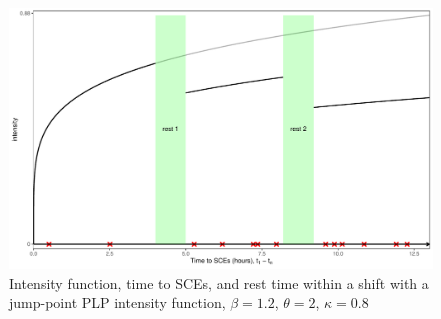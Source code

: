\documentclass[12pt]{book}
\numberwithin{equation}{chapter}
\begin{document}
\begin{figure}[!ht]

{\centering \includegraphics[width=\linewidth]{figs/PLP_jump_point_intensity} 

}

\caption{Intensity function, time to SCEs, and rest time within a shift with a jump-point PLP intensity function, $\beta = 1.2$, $\theta=2$, $\kappa=0.8$}\label{fig:plpnhpp}
\end{figure}
\end{document}
